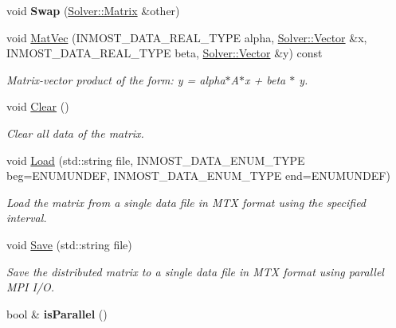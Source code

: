\begin{DoxyCompactItemize}
\item 
\hypertarget{classINMOST_1_1Solver_1_1Matrix_a006a6a465b12f409964f6aae40b4ad66}{void {\bfseries Swap} (\hyperlink{classINMOST_1_1Solver_1_1Matrix}{Solver\-::\-Matrix} \&other)}\label{classINMOST_1_1Solver_1_1Matrix_a006a6a465b12f409964f6aae40b4ad66}

\item 
void \hyperlink{classINMOST_1_1Solver_1_1Matrix_acc2a6bf3bc331e8087069a7dd7e46046}{Mat\-Vec} (I\-N\-M\-O\-S\-T\-\_\-\-D\-A\-T\-A\-\_\-\-R\-E\-A\-L\-\_\-\-T\-Y\-P\-E alpha, \hyperlink{classINMOST_1_1Solver_1_1Vector}{Solver\-::\-Vector} \&x, I\-N\-M\-O\-S\-T\-\_\-\-D\-A\-T\-A\-\_\-\-R\-E\-A\-L\-\_\-\-T\-Y\-P\-E beta, \hyperlink{classINMOST_1_1Solver_1_1Vector}{Solver\-::\-Vector} \&y) const 
\begin{DoxyCompactList}\small\item\em Matrix-\/vector product of the form\-: y = alpha$\ast$\-A$\ast$x + beta $\ast$ y. \end{DoxyCompactList}\item 
\hypertarget{classINMOST_1_1Solver_1_1Matrix_a05c9758b8dee6bcc3bcb7a65fd8773b8}{void \hyperlink{classINMOST_1_1Solver_1_1Matrix_a05c9758b8dee6bcc3bcb7a65fd8773b8}{Clear} ()}\label{classINMOST_1_1Solver_1_1Matrix_a05c9758b8dee6bcc3bcb7a65fd8773b8}

\begin{DoxyCompactList}\small\item\em Clear all data of the matrix. \end{DoxyCompactList}\item 
void \hyperlink{classINMOST_1_1Solver_1_1Matrix_a31445fd10a833878cdee04b75953aa0e}{Load} (std\-::string file, I\-N\-M\-O\-S\-T\-\_\-\-D\-A\-T\-A\-\_\-\-E\-N\-U\-M\-\_\-\-T\-Y\-P\-E beg=E\-N\-U\-M\-U\-N\-D\-E\-F, I\-N\-M\-O\-S\-T\-\_\-\-D\-A\-T\-A\-\_\-\-E\-N\-U\-M\-\_\-\-T\-Y\-P\-E end=E\-N\-U\-M\-U\-N\-D\-E\-F)
\begin{DoxyCompactList}\small\item\em Load the matrix from a single data file in M\-T\-X format using the specified interval. \end{DoxyCompactList}\item 
void \hyperlink{classINMOST_1_1Solver_1_1Matrix_ac1998465907651dd88cdb1e45dd8080e}{Save} (std\-::string file)
\begin{DoxyCompactList}\small\item\em Save the distributed matrix to a single data file in M\-T\-X format using parallel M\-P\-I I/\-O. \end{DoxyCompactList}\item 
\hypertarget{classINMOST_1_1Solver_1_1Matrix_aa7e832323aa0fbcb7d16f18142a74718}{bool \& {\bfseries is\-Parallel} ()}\label{classINMOST_1_1Solver_1_1Matrix_aa7e832323aa0fbcb7d16f18142a74718}


\end{DoxyCompactItemize}
